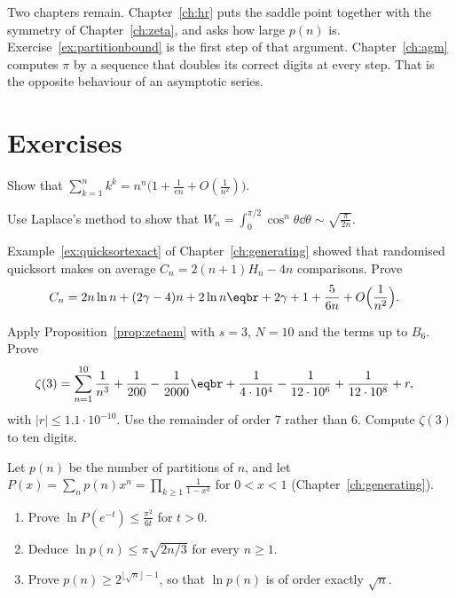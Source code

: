 Two chapters remain. Chapter~\ref{ch:hr} puts the saddle point together with the symmetry of Chapter~\ref{ch:zeta}, and asks how large $p(n)$ is. Exercise~\ref{ex:partitionbound} is the first step of that argument. Chapter~\ref{ch:agm} computes $\pi$ by a sequence that doubles its correct digits at every step. That is the opposite behaviour of an asymptotic series.

\section{Exercises}

\begin{exercise}[$\star$]\label{ex:kk}
Show that $\sum_{k=1}^nk^k=n^n\bigl(1+\frac1{en}+O(\frac1{n^2})\bigr)$.
\end{exercise}

\begin{exercise}[$\star$]\label{ex:wallislaplace}
Use Laplace's method to show that $W_n=\int_0^{\pi/2}\cos^n\theta\dd\theta\sim\sqrt{\frac\pi{2n}}$.
\end{exercise}

\begin{exercise}[$\star\star$]\label{ex:quickexp}
Example~\ref{ex:quicksortexact} of Chapter~\ref{ch:generating} showed that randomised quicksort makes on average $C_n=2(n+1)H_n-4n$ comparisons. Prove
\[
\begin{aligned}C_n&=2n\ln n+(2\gamma-4)n+2\ln n\eqbr+2\gamma+1+\frac5{6n}+O\Bigl(\frac1{n^2}\Bigr).\end{aligned}
\]
\end{exercise}

\begin{exercise}[$\star\star$]\label{ex:zeta3}
Apply Proposition~\ref{prop:zetaem} with $s=3$, $N=10$ and the terms up to $B_6$. Prove
\[
\begin{aligned}\zeta(3)&=\sum_{n=1}^{10}\frac1{n^3}+\frac1{200}-\frac1{2000}\eqbr+\frac1{4\cdot10^4}-\frac1{12\cdot10^6}+\frac1{12\cdot10^8}+r,\end{aligned}
\]
with $|r|\le1.1\cdot10^{-10}$. Use the remainder of order $7$ rather than $6$. Compute $\zeta(3)$ to ten digits.
\end{exercise}

\begin{exercise}[$\star\star$]\label{ex:partitionbound}
Let $p(n)$ be the number of partitions of $n$, and let $P(x)=\sum_np(n)x^n=\prod_{k\ge1}\frac1{1-x^k}$ for $0<x<1$ (Chapter~\ref{ch:generating}).
\begin{enumerate}[label=(\alph*)]
\item Prove $\ln P(e^{-t})\le\frac{\pi^2}{6t}$ for $t>0$.
\item Deduce $\ln p(n)\le\pi\sqrt{2n/3}$ for every $n\ge1$.
\item Prove $p(n)\ge2^{\lfloor\sqrt n\rfloor-1}$, so that $\ln p(n)$ is of order exactly $\sqrt n$.
\end{enumerate}
\end{exercise}

